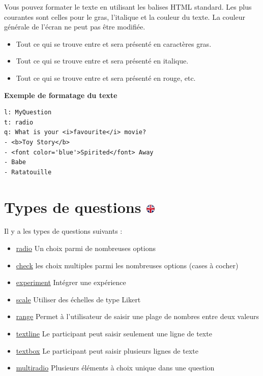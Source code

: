 \documentclass[
]{book}
\providecommand{\tightlist}{%
  \setlength{\itemsep}{0pt}\setlength{\parskip}{0pt}}
\begin{document}
Vous pouvez formater le texte en utilisant les balises HTML standard. Les plus courantes sont celles pour le gras, l'italique et la couleur du texte. La couleur générale de l'écran ne peut pas être modifiée.

\begin{itemize}
\tightlist
\item
  Tout ce qui se trouve entre et sera présenté en caractères gras.
\item
  Tout ce qui se trouve entre et sera présenté en italique.
\item
  Tout ce qui se trouve entre et sera présenté en rouge, etc.
\end{itemize}

\textbf{Exemple de formatage du texte}

\begin{verbatim}
l: MyQuestion
t: radio
q: What is your <i>favourite</i> movie?
- <b>Toy Story</b>
- <font color='blue'>Spirited</font> Away
- Babe
- Ratatouille
\end{verbatim}

\hypertarget{types-de-questions}{%
\section[Types de questions ]{\texorpdfstring{Types de questions \href{https://www.psytoolkit.org/doc3.4.0/online-survey-syntax.html\#questiontypes}{\protect\includegraphics{img/ukflag.png}}}{Types de questions }}\label{types-de-questions}}

Il y a les types de questions suivants :

\begin{itemize}
\tightlist
\item
  \protect\hyperlink{radio}{radio} Un choix parmi de nombreuses options
\item
  \protect\hyperlink{check}{check} les choix multiples parmi les nombreuses options (cases à cocher)
\item
  \protect\hyperlink{experiment}{experiment} Intégrer une expérience
\item
  \protect\hyperlink{scale}{scale} Utiliser des échelles de type Likert
\item
  \protect\hyperlink{range}{range} Permet à l'utilisateur de saisir une plage de nombres entre deux valeurs
\item
  \protect\hyperlink{textline}{textline} Le participant peut saisir seulement une ligne de texte
\item
  \protect\hyperlink{textbox}{textbox} Le participant peut saisir plusieurs lignes de texte
\item
  \protect\hyperlink{multiradio}{multiradio} Plusieurs éléments à choix unique dans une question
\end{itemize}
\end{document}
